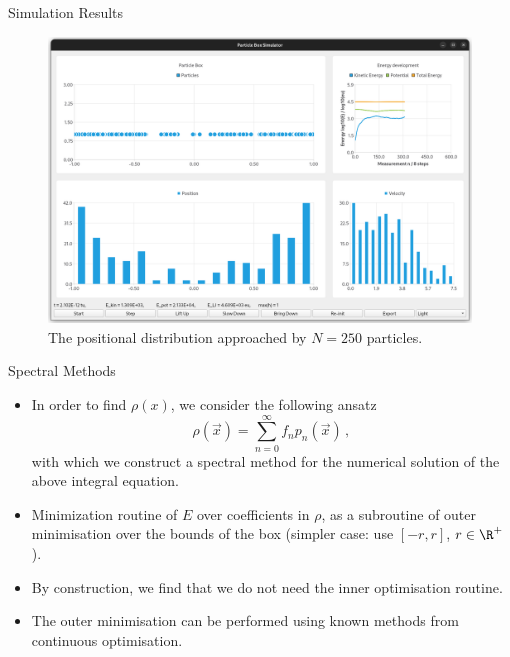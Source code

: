 \documentclass[aspectratio=169, hyperref={colorlinks=true}]{beamer}
\begin{document}
  \begin{frame}{Simulation Results}
    \begin{figure}
      \centering
      \includegraphics[width=0.64\linewidth]{figures/screenshot5.png}
      \caption*{The positional distribution approached by $N = 250$ particles.}
    \end{figure}
  \end{frame}

  \begin{frame}{Spectral Methods}
    \begin{itemize}
      \item In order to find $\rho(x)$, we consider the following ansatz
            $$\rho(\vec{x}) = \sum_{n=0}^{\infty} f_n p_n(\vec{x})\,,$$
            with which we construct a spectral method for the numerical solution of the above integral equation.
      \item Minimization routine of $E$ over coefficients in $\rho$, as a subroutine of outer minimisation over the bounds of the box (simpler case: use $[-r, r]$, $r \in \R^+$).
      \item By construction, we find that we do not need the inner optimisation routine.
      \item The outer minimisation can be performed using known methods from continuous optimisation.
    \end{itemize}
  \end{frame}
\end{document}
